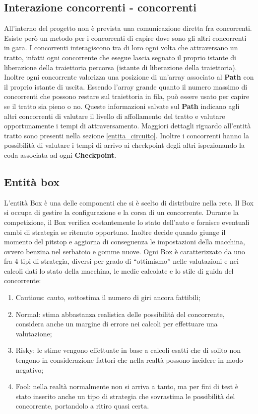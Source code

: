 \subsection{Interazione concorrenti - concorrenti}
All'interno del progetto non è prevista una comunicazione diretta fra
concorrenti. Esiste però un metodo per i concorrenti di capire dove sono gli
altri concorrenti in gara. I concorrenti interagiscono tra di loro ogni volta
che attraversano un tratto, infatti ogni concorrente che esegue lascia segnato
il proprio istante di liberazione della traiettoria percorsa (istante di liberazione della traiettoria). 
Inoltre ogni concorrente valorizza una posizione di un'array associato al \textbf{Path}
con il proprio istante di uscita. Essendo l'array grande quanto il numero massimo di concorrenti
che possono restare sul traiettoria in fila, può essere usato per capire se il tratto sia pieno o no.
Queste informazioni salvate sul \textbf{Path}
indicano agli altri concorrenti di valutare il livello di affollamento del tratto e valutare
opportunamente i tempi di attraversamento. Maggiori dettagli riguardo all'entità tratto sono presenti nella sezione
\ref{entita_circuito}. Inoltre i concorrenti hanno la possibilità di valutare i tempi di arrivo ai checkpoint degli altri
ispezionando la coda associata ad ogni \textbf{Checkpoint}.
\subsection{Entità box}
L'entità Box è una delle componenti che si è scelto di distribuire nella rete.
Il Box si occupa di gestire la configurazione e la corsa di un concorrente.
Durante la competizione, il Box verifica costantemente lo stato dell'auto e
fornisce eventuali cambi di strategia se ritenuto opportuno. Inoltre decide
quando giunge il momento del pitstop e aggiorna di conseguenza le impostazioni
della macchina, ovvero benzina nel serbatoio e gomme nuove. Ogni Box è
caratterizzato da uno fra 4 tipi di strategia, diversi per grado di
``ottimismo'' nelle valutazioni e nei calcoli dati lo stato della macchina, le
medie calcolate e lo stile di guida del concorrente:
\begin{enumerate}
\item Cautious: cauto, sottostima il numero di giri ancora fattibili;
\item Normal: stima abbastanza realistica delle possibilità del concorrente,
considera anche un margine di errore nei calcoli per effettuare una valutazione;
\item Risky: le stime vengono effettuate in base a calcoli esatti che di solito
non tengono in considerazione fattori che nella realtà possono incidere in modo
negativo;
\item Fool: nella realtà normalmente non si arriva a tanto, ma per fini di test
è stato inserito anche un tipo di strategia che sovrastima le possibilità del
concorrente, portandolo a ritiro quasi certa.
\end{enumerate}

